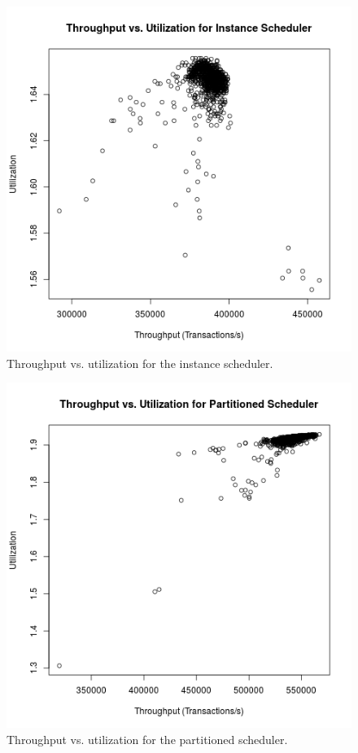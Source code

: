 \begin{figure}
\center
\includegraphics[width=\textwidth]{instance_throughput_utilization.png}
\caption{Throughput vs. utilization for the instance scheduler. \label{instance_throughput_utilization}}
\end{figure}

\begin{figure}
\center
\includegraphics[width=\textwidth]{partitioned_throughput_utilization.png}
\caption{Throughput vs. utilization for the partitioned scheduler. \label{partitioned_throughput_utilization}}
\end{figure}

